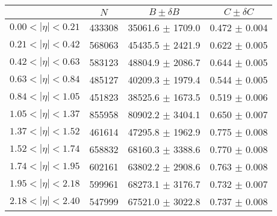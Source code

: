 \begin{tabular}{lccc}
\hline
    &   $N$   & $B \pm \delta B$  &  $C \pm \delta C$ \\
\hline
$0.00 < |\eta| <0.21$          & 433308     & 35061.6    $\pm$ 1709.0 & 0.472      $\pm$ 0.004 \\
$0.21 < |\eta| <0.42$          & 568063     & 45435.5    $\pm$ 2421.9 & 0.622      $\pm$ 0.005 \\
$0.42 < |\eta| <0.63$          & 583123     & 48804.9    $\pm$ 2086.7 & 0.644      $\pm$ 0.005 \\
$0.63 < |\eta| <0.84$          & 485127     & 40209.3    $\pm$ 1979.4 & 0.544      $\pm$ 0.005 \\
$0.84 < |\eta| <1.05$          & 451823     & 38525.6    $\pm$ 1673.5 & 0.519      $\pm$ 0.006 \\
$1.05 < |\eta| <1.37$          & 855958     & 80902.2    $\pm$ 3404.1 & 0.650      $\pm$ 0.007 \\
$1.37 < |\eta| <1.52$          & 461614     & 47295.8    $\pm$ 1962.9 & 0.775      $\pm$ 0.008 \\
$1.52 < |\eta| <1.74$          & 658832     & 68160.3    $\pm$ 3388.6 & 0.770      $\pm$ 0.008 \\
$1.74 < |\eta| <1.95$          & 602161     & 63802.2    $\pm$ 2908.6 & 0.763      $\pm$ 0.008 \\
$1.95 < |\eta| <2.18$          & 599961     & 68273.1    $\pm$ 3176.7 & 0.732      $\pm$ 0.007 \\
$2.18 < |\eta| <2.40$          & 547999     & 67521.0    $\pm$ 3022.8 & 0.737      $\pm$ 0.008 \\
\hline
\end{tabular}
